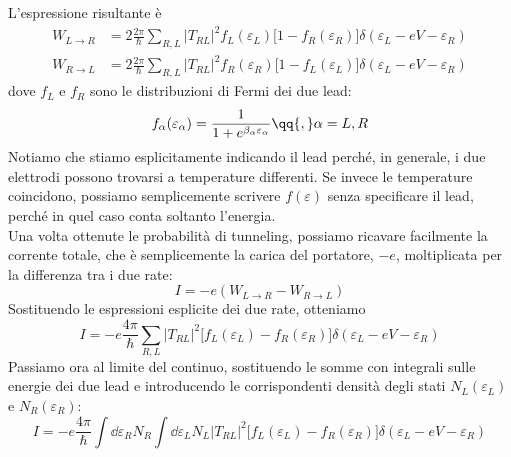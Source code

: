 L'espressione risultante è
\begin{equation*}
    \begin{split}
        W_{L \to R}
        &=
        2\frac{2\pi}{\hbar}
        \sum_{R,L}
        |T_{RL}|^2
        f_L(\varepsilon_L)
        \bigl[
            1-f_R(\varepsilon_R)
        \bigr]
        \delta(
            \varepsilon_L-eV-\varepsilon_R
        )
        \\
        W_{R \to L}
        &= 2\frac{2\pi}{\hbar} \sum_{R,L} |T_{RL}|^2 f_R(\varepsilon_R) \bigl[ 1 - f_L(\varepsilon_L) \bigr] \delta(\varepsilon_L - eV - \varepsilon_R)
    \end{split}
\end{equation*}
dove $f_L$ e $f_R$ sono le distribuzioni di Fermi dei due lead:
\begin{equation*}
    f_{\alpha}(\varepsilon_\alpha)
    =\frac{1}{1 + e^{\beta_\alpha \varepsilon_\alpha}}
    \qq{,}
    \alpha=L,R
\end{equation*}
Notiamo che stiamo esplicitamente indicando il lead perché, in generale, i due elettrodi possono trovarsi a temperature differenti. Se invece le temperature coincidono, possiamo semplicemente scrivere $f(\varepsilon)$ senza specificare il lead, perché in quel caso conta soltanto l'energia.\\
Una volta ottenute le probabilità di tunneling, possiamo ricavare facilmente la corrente totale, che è semplicemente la carica del portatore, $-e$, moltiplicata per la differenza tra i due rate:
\begin{equation*}
    I = -e ( W_{L \to R} - W_{R \to L} )
\end{equation*}
Sostituendo le espressioni esplicite dei due rate, otteniamo
\begin{equation*}
    I = -e \frac{4\pi}{\hbar} \sum_{R,L} |T_{RL}|^2 \bigl[ f_L(\varepsilon_L) - f_R(\varepsilon_R) \bigr] \delta( \varepsilon_L-eV-\varepsilon_R )
\end{equation*}
Passiamo ora al limite del continuo, sostituendo le somme con integrali sulle energie dei due lead e introducendo le corrispondenti densità degli stati $N_L(\varepsilon_L)$ e $N_R(\varepsilon_R)$:
\begin{equation*}
    I = -e \frac{4\pi}{\hbar} \int \dd{\varepsilon_R} N_R \int \dd{\varepsilon_L} N_L |T_{RL}|^2 \bigl[ f_L(\varepsilon_L) - f_R(\varepsilon_R) \bigr] \delta( \varepsilon_L-eV-\varepsilon_R )
\end{equation*}
